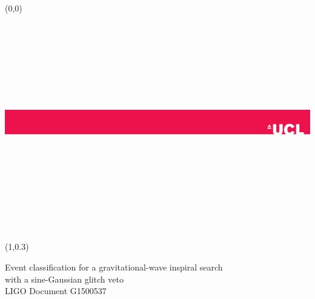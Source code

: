 \documentclass[a0,portrait]{a0poster}
\begin{document}
%
%

\begin{textblock}{20}(0,0)
\includegraphics[height=3.7in]{banners/banner2.pdf}
\end{textblock}


\begin{textblock}{17}(1,0.3)	 %
{\color{TitleColor}
 \begin{center}
 { \Huge \bf{
 \noindent
 Event classification for a gravitational-wave inspiral search \\
 with a sine-Gaussian glitch veto \\
 \vspace*{-0.6cm}
 {\small LIGO Document G1500537} \par}
 }
 \end{center}
}
\end{textblock}
\end{document}
